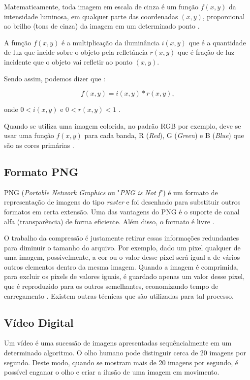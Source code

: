 Matematicamente, toda imagem em escala de cinza é um função $f(x,y)$ da intensidade luminosa, em qualquer parte das coordenadas $(x,y)$, proporcional ao brilho (tons de cinza) da imagem em um determinado ponto \cite{gonzalez_woods}. 

A função  $f(x,y)$  é a multiplicação da iluminância  $i(x,y)$ que é a quantidade de luz que incide sobre o objeto pela refletância  $r(x,y)$  que é fração de luz incidente que o objeto vai refletir ao ponto $(x,y)$. 

Sendo assim, podemos dizer que :

\begin{equation}
f(x,y) = i(x,y) * r(x,y),
\end{equation}

onde $0 < i(x,y)$ e $0 < r(x,y) < 1$ .

Quando se utiliza uma imagem colorida, no padrão RGB por exemplo,  deve se usar uma função $f(x,y)$ para cada banda, R (\textit{Red}), G (\textit{Green}) e B (\textit{Blue}) que são as cores primárias \cite{gonzalez_woods}.

 
\subsection{Formato PNG}\label{subsec:png}

PNG (\textit{Portable Network Graphics} ou "\textit{PNG is Not f}") é um formato de representação de imagens do tipo \textit{raster} e foi desenhado para substituir outros formatos em certa extensão. Uma das vantagens do PNG é o suporte de canal alfa (transparência) de forma eficiente. Além disso, o formato é livre \cite{png}. 

O trabalho da compressão é justamente retirar essas informações redundantes para diminuir o tamanho do arquivo. Por exemplo, dado um pixel qualquer de uma imagem, possivelmente, a cor ou o valor desse pixel será igual a de vários outros elementos dentro da mesma imagem. Quando a imagem é comprimida, para excluir os pixels de valores iguais, é guardado apenas um valor desse pixel, que é reproduzido para os outros semelhantes, economizando tempo de carregamento \cite{img_compact}. Existem outras técnicas que são utilizadas para tal processo.

 \subsection{Vídeo Digital}\label{subsec:videodigi}
 
 Um vídeo é uma sucessão de imagens apresentadas sequêncialmente em um determinado algoritmo. O olho humano pode distinguir cerca de 20 imagens por segundo. Deste modo, quando se mostram mais de 20 imagens por segundo, é possível enganar o olho e criar a ilusão de uma imagem em movimento. 
 
